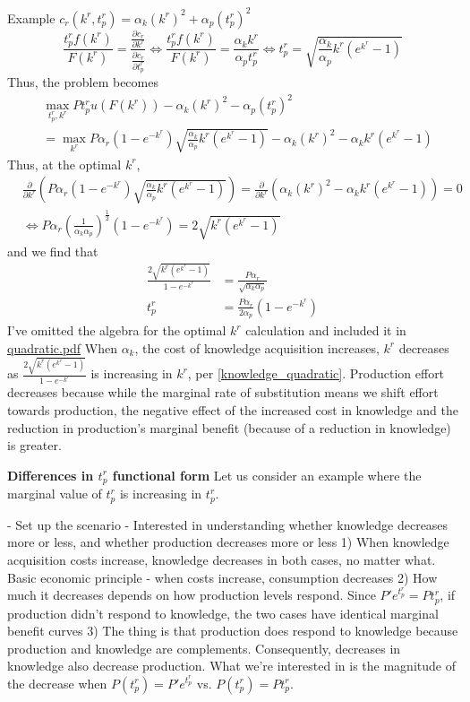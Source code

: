 \documentclass[source/paper/main.tex]{subfiles}
\begin{document}
Example $c_r(k^r, t_p^r) = \alpha_k (k^r)^2 + \alpha_p (t_p^r)^2$\\
$$\frac{t_p^r f(k^r) }{F(k^r)} = \frac{\frac{\partial c_r}{\partial k^r}}{\frac{\partial c_r}{\partial t_p^r}} \iff \frac{t_p^r f(k^r) }{F(k^r)} = \frac{\alpha_k k^r}{\alpha_p t_p^r} \iff t_p^r = \sqrt{\frac{\alpha_k}{\alpha_p} k^r (e^{k^r} - 1)} $$
Thus, the problem becomes
\begin{align*}
    &\max_{t_p^r, k^r} P  t_p^r  u(F(k^r)) - \alpha_k (k^r)^2 - \alpha_p (t_p^r)^2 \\
    &= \max_{k^r} P\alpha_r(1-e^{-k^r}) \sqrt{\frac{\alpha_k}{\alpha_p} k^r (e^{k^r} - 1)}  -\alpha_k (k^r)^2 - \alpha_k k^r (e^{k^r} - 1)
\end{align*}
Thus, at the optimal $k^r$, 
\begin{align*}
    &\frac{\partial }{\partial k^r} \left(P\alpha_r(1-e^{-k^r}) \sqrt{\frac{\alpha_k}{\alpha_p} k^r (e^{k^r} - 1)}\right) = \frac{\partial }{\partial k^r} \left( \alpha_k (k^r)^2 - \alpha_k k^r (e^{k^r} - 1) \right) = 0 \\
    &\iff P \alpha_r \left(\frac{1}{\alpha_k \alpha_p}\right)^{\frac12 } (1 - e^{-k^r}) = 2 \sqrt{k^r (e^{k^r} - 1)}
\end{align*}
and we find that
\begin{align}
    \frac{2\sqrt{k^r(e^{k^r} - 1)}}{1-e^{-k^r}} &= \frac{P\alpha_r}{\sqrt{\alpha_k \alpha_p}} \label{knowledge_quadratic} \\
    t_p^r &= \frac{P\alpha_r}{2\alpha_p} (1-e^{-k^r}) \label{production_effort_quadratic}
\end{align}
I've omitted the algebra for the optimal $k^r$ calculation and included it in 
\href{run:source/paper/math/quadratic.pdf}{quadratic.pdf}
When $\alpha_k$, the cost of knowledge acquisition increases, $k^r$ decreases as $\frac{2\sqrt{k^r(e^{k^r} - 1)}}{1-e^{-k^r}}$ is increasing in $k^r$, per \ref{knowledge_quadratic}. Production effort decreases because while the marginal rate of substitution means we shift effort towards production, the negative effect of the increased cost in knowledge and the reduction in production's marginal benefit (because of a reduction in knowledge) is greater.  

\textbf{Differences in $t_p^r$ functional form}
Let us consider an example where the marginal value of $t_p^r$ is increasing in $t_p^r$. 

- Set up the scenario
- Interested in understanding whether knowledge decreases more or less, and whether production decreases more or less
1) When knowledge acquisition costs increase, knowledge decreases in both cases, no matter what. Basic economic principle - when costs increase, consumption decreases
2) How much it decreases depends on how production levels respond. Since $P' e^{t_p^r} = P t_p^r$, if production didn't respond to knowledge, the two cases have identical marginal benefit curves
3) The thing is that production does respond to knowledge because production and knowledge are complements. Consequently, decreases in knowledge also decrease production. What we're interested in is the magnitude of the decrease when $P(t_p^r) = P' e^{t_p^r}$ vs. $P(t_p^r) = P t_p^r$. 
\end{document}
